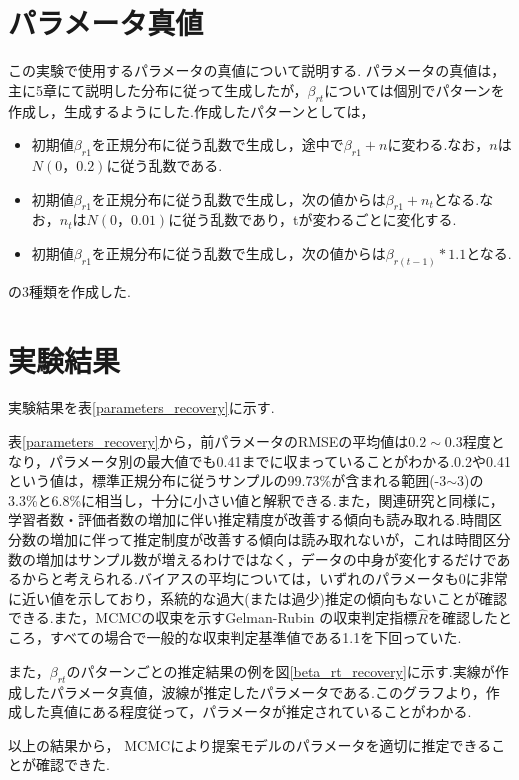 \documentclass[a4paper,11pt,oneside,openany]{jsbook}
\begin{document}
\section{パラメータ真値}
この実験で使用するパラメータの真値について説明する.
パラメータの真値は，主に5章にて説明した分布に従って生成したが，$\beta_{rt}$については個別でパターンを作成し，生成するようにした.作成したパターンとしては，
\begin{itemize}
\item 初期値$\beta_{r1}$を正規分布に従う乱数で生成し，途中で$\beta_{r1}+n$に変わる.なお，$n$は$N(0，0.2)$に従う乱数である.
\item 初期値$\beta_{r1}$を正規分布に従う乱数で生成し，次の値からは$\beta_{r1}+n_t$となる.なお，$n_t$は$N(0，0.01)$に従う乱数であり，tが変わるごとに変化する.
\item 初期値$\beta_{r1}$を正規分布に従う乱数で生成し，次の値からは$\beta_{r(t-1)}*1.1$となる.
\end{itemize}
の3種類を作成した.
\section{実験結果}
実験結果を表\ref{parameters_recovery}に示す.

表\ref{parameters_recovery}から，前パラメータのRMSEの平均値は$0.2\sim0.3$程度となり，パラメータ別の最大値でも0.41までに収まっていることがわかる.0.2や0.41という値は，標準正規分布に従うサンプルの99.73\%が含まれる範囲(-3$\sim$3)の3.3\%と6.8\%に相当し，十分に小さい値と解釈できる.また，関連研究と同様に，学習者数・評価者数の増加に伴い推定精度が改善する傾向も読み取れる.時間区分数の増加に伴って推定制度が改善する傾向は読み取れないが，これは時間区分数の増加はサンプル数が増えるわけではなく，データの中身が変化するだけであるからと考えられる.バイアスの平均については，いずれのパラメータも0に非常に近い値を示しており，系統的な過大(または過少)推定の傾向もないことが確認できる.また，MCMCの収束を示すGelman-Rubin の収束判定指標$ \hat{R} $\cite{RhatRubin,RhatCarlin}を確認したところ，すべての場合で一般的な収束判定基準値である1.1を下回っていた.

また，$\beta_{rt}$のパターンごとの推定結果の例を図\ref{beta_rt_recovery}に示す.実線が作成したパラメータ真値，波線が推定したパラメータである.このグラフより，作成した真値にある程度従って，パラメータが推定されていることがわかる.

以上の結果から， MCMCにより提案モデルのパラメータを適切に推定できることが確認できた.
\end{document}
